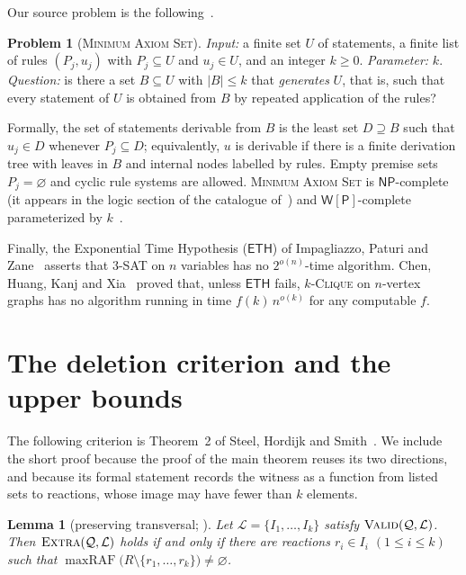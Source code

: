 \documentclass[11pt,a4paper]{article}
\theoremstyle{plain}
\newtheorem{lemma}[theorem]{Lemma}
\theoremstyle{definition}
\newtheorem{problem}[theorem]{Problem}
\theoremstyle{remark}
\newcommand{\maxRAF}{\operatorname{maxRAF}}
\newcommand{\Valid}{\textup{\textsc{Valid}}}
\newcommand{\Extra}{\textup{\textsc{Extra}}}
\newcommand{\MAS}{\textup{\textsc{Minimum Axiom Set}}}
\newcommand{\Clique}{\textup{\textsc{Clique}}}
\newcommand{\NP}{\mathsf{NP}}
\newcommand{\WP}{\mathsf{W[P]}}
\newcommand{\ETH}{\mathsf{ETH}}
\newcommand{\cL}{\mathcal{L}}
\newcommand{\cQ}{\mathcal{Q}}
\begin{document}
Our source problem is the following~\cite{garey1979computers}.

\begin{problem}[\MAS]
\emph{Input:} a finite set $U$ of statements, a finite list of rules $(P_j,u_j)$ with $P_j\subseteq U$ and $u_j\in U$, and an integer $k\ge 0$. \emph{Parameter:} $k$. \emph{Question:} is there a set $B\subseteq U$ with $|B|\le k$ that \emph{generates} $U$, that is, such that every statement of $U$ is obtained from $B$ by repeated application of the rules?
\end{problem}

Formally, the set of statements derivable from $B$ is the least set $D\supseteq B$ such that $u_j\in D$ whenever $P_j\subseteq D$; equivalently, $u$ is derivable if there is a finite derivation tree with leaves in $B$ and internal nodes labelled by rules. Empty premise sets $P_j=\varnothing$ and cyclic rule systems are allowed. \MAS{} is $\NP$-complete (it appears in the logic section of the catalogue of~\cite{garey1979computers}) and $\WP$-complete parameterized by $k$~\cite[Theorem~3.3]{abrahamson1995completeness}.

Finally, the Exponential Time Hypothesis ($\ETH$) of Impagliazzo, Paturi and Zane~\cite{impagliazzo2001eth} asserts that $3$-\textsc{SAT} on $n$ variables has no $2^{o(n)}$-time algorithm. Chen, Huang, Kanj and Xia~\cite{chen2006strong} proved that, unless $\ETH$ fails, $k$-\Clique{} on $n$-vertex graphs has no algorithm running in time $f(k)\,n^{o(k)}$ for any computable $f$.

\section{The deletion criterion and the upper bounds}\label{sec:upper}

The following criterion is Theorem~2 of Steel, Hordijk and Smith~\cite{steel2013minimal}. We include the short proof because the proof of the main theorem reuses its two directions, and because its formal statement records the witness as a function from listed sets to reactions, whose image may have fewer than $k$ elements.

\begin{lemma}[preserving transversal; {\cite[Theorem~2]{steel2013minimal}}]\label{lem:transversal}
Let $\cL=\{I_1,\dots,I_k\}$ satisfy $\Valid(\cQ,\cL)$. Then $\Extra(\cQ,\cL)$ holds if and only if there are reactions $r_i\in I_i$ $(1\le i\le k)$ such that $\maxRAF\bigl(R\setminus\{r_1,\dots,r_k\}\bigr)\neq\varnothing$.
\end{lemma}
\end{document}

